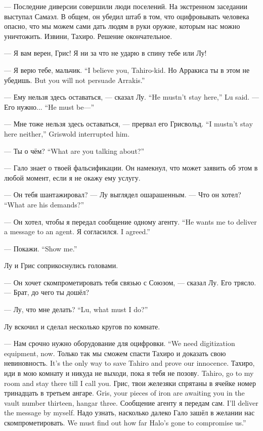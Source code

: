 \textspace

--- Последние диверсии совершили люди поселений.
На экстренном заседании выступал Самаэл.
В общем, он убедил штаб в том, что оцифровывать человека опасно, что мы можем сами дать людям в руки оружие, которым нас можно уничтожить.
Извини, Тахиро.
Решение окончательное.

--- Я вам верен, Грис!
Я ни за что не ударю в спину тебе или Лу!

{--- Я верю тебе, мальчик.}
{``I believe you, Tahiro-kid.}
{Но Арракиса ты в этом не убедишь.}
{But you will not persuade Arrakis.''}

{--- Ему нельзя здесь оставаться, --- сказал Лу.}
{``He mustn't stay here,'' Lu said.}
{--- Его нужно...}
{``He must be---''}

{--- Мне тоже нельзя здесь оставаться, --- прервал его Грисвольд.}
{``I mustn't stay here neither,'' Griswold interrupted him.}

{--- Ты о чём?}
{``What are you talking about?''}

--- Гало знает о твоей фальсификации.
Он намекнул, что может заявить об этом в любой момент, если я не окажу ему услугу.

--- Он тебя шантажировал? --- Лу выглядел ошарашенным.
{--- Что он хотел?}
{``What are his demands?''}

{--- Он хотел, чтобы я передал сообщение одному агенту.}
{``He wants me to deliver a message to an agent.}
{Я согласился.}
{I agreed.''}

{--- Покажи.}
{``Show me.''}

Лу и Грис соприкоснулись головами.

--- Он хочет скомпрометировать тебя связью с Союзом, --- сказал Лу.
Его трясло.
--- Брат, до чего ты дошёл?

{--- Лу, что мне делать?}
{``Lu, what must I do?''}

Лу вскочил и сделал несколько кругов по комнате.

{--- Нам срочно нужно оборудование для оцифровки.}
{``We need digitization equipment, now.}
{Только так мы сможем спасти Тахиро и доказать свою невиновность.}
{It's the only way to save Tahiro and prove our innocence.}
{Тахиро, иди в мою комнату и никуда не выходи, пока я тебя не позову.}
{Tahiro, go to my room and stay there till I call you.}
{Грис, твои железяки спрятаны в ячейке номер тринадцать в третьем ангаре.}
{Gris, your pieces of iron are awaiting you in the vault number thirteen, hangar three.}
{Сообщение агенту я передам сам.}
{I'll deliver the message by myself.}
{Надо узнать, насколько далеко Гало зашёл в желании нас скомпрометировать.}
{We must find out how far Halo's gone to compromise us.''}

